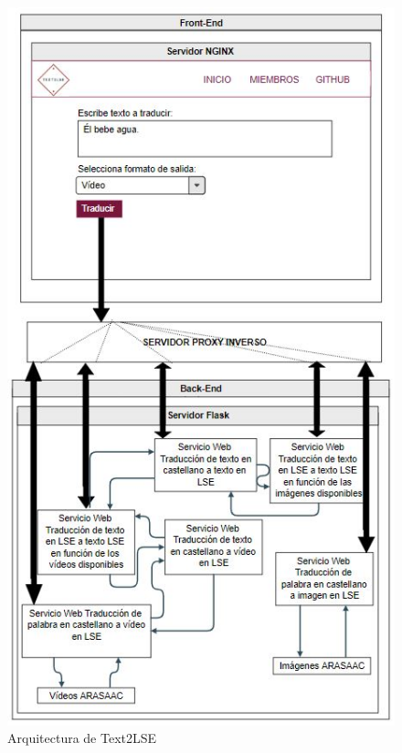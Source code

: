 \begin{figure}[]
	\centering
	
	\includegraphics[width=1\textwidth]{Imagenes/Fuentes/Text2LSE/ArquitecturaText2LSE.jpg}
	\caption{Arquitectura de Text2LSE }
	\label {fig: imgArquitecturaText2LSE}
\end{figure}

